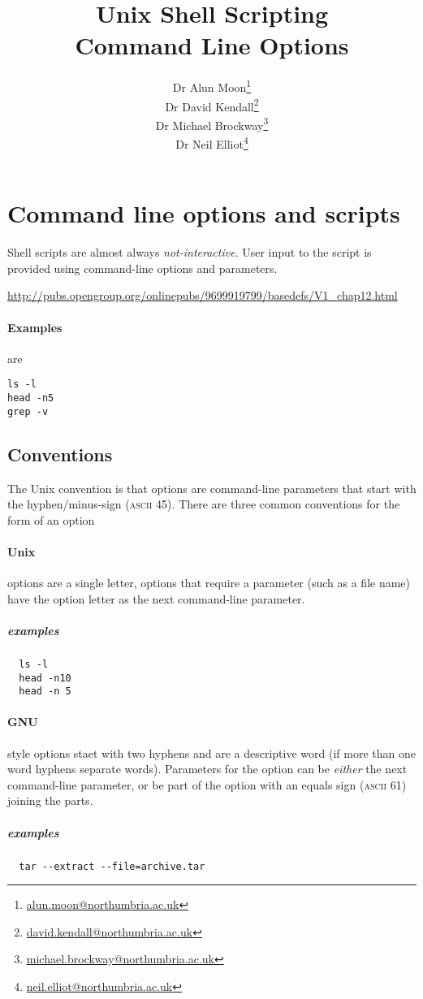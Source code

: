 \documentclass{article}
\title{Unix Shell Scripting \\ Command Line Options}
\author{%
Dr Alun Moon\thanks{\url{alun.moon@northumbria.ac.uk}}\\
Dr David Kendall\thanks{\url{david.kendall@northumbria.ac.uk}}\\
Dr Michael Brockway\thanks{\url{michael.brockway@northumbria.ac.uk}}\\
Dr Neil Elliot\thanks{\url{neil.elliot@northumbria.ac.uk}}
}
\begin{document}
\maketitle
\newpage
\section{Command line options and scripts}
Shell scripts are almost always \emph{not-interactive}.
User input to the script is provided using command-line options and parameters.

\url{http://pubs.opengroup.org/onlinepubs/9699919799/basedefs/V1_chap12.html}

\paragraph{Examples} are
\begin{verbatim}
ls -l
head -n5
grep -v
\end{verbatim}

\subsection{Conventions}
The Unix convention is that options are command-line parameters that start with the hyphen/minus-sign (\textsc{ascii} 45).  There are three common conventions for the form of an option

\paragraph{Unix} options are a single letter, options that require a parameter (such as a file name) have the option letter as the next command-line parameter.
\subparagraph{examples}
\begin{verbatim}
  ls -l
  head -n10
  head -n 5
\end{verbatim}

\paragraph{GNU} style options staet with two hyphens and are a descriptive word (if more than one word hyphens separate words).  Parameters for the option can be \emph{either} the next command-line parameter, or be part of the option with an equals sign (\textsc{ascii} 61) joining the parts.
\subparagraph{examples}
\begin{verbatim}
  tar --extract --file=archive.tar
\end{verbatim}
\end{document}
